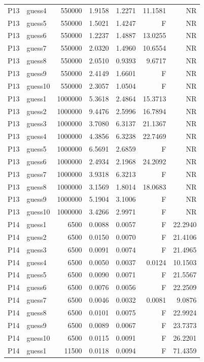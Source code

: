 {\begin{longtable}{llrrrrr}
P13 & guess4 & 550000 & 1.9158 & 1.2271 & 11.1581 & NR \\
P13 & guess5 & 550000 & 1.5021 & 1.4247 & F & NR \\
P13 & guess6 & 550000 & 1.2237 & 1.4887 & 13.0255 & NR \\
P13 & guess7 & 550000 & 2.0320 & 1.4960 & 10.6554 & NR \\
P13 & guess8 & 550000 & 2.0510 & 0.9393 & 9.6717 & NR \\
P13 & guess9 & 550000 & 2.4149 & 1.6601 & F & NR \\
P13 & guess10 & 550000 & 2.3057 & 1.0504 & F & NR \\
P13 & guess1 & 1000000 & 5.3618 & 2.4864 & 15.3713 & NR \\
P13 & guess2 & 1000000 & 9.4476 & 2.5996 & 16.7894 & NR \\
P13 & guess3 & 1000000 & 3.7080 & 6.3137 & 21.1367 & NR \\
P13 & guess4 & 1000000 & 4.3856 & 6.3238 & 22.7469 & NR \\
P13 & guess5 & 1000000 & 6.5691 & 2.6859 & F & NR \\
P13 & guess6 & 1000000 & 2.4934 & 2.1968 & 24.2092 & NR \\
P13 & guess7 & 1000000 & 3.9318 & 6.3213 & F & NR \\
P13 & guess8 & 1000000 & 3.1569 & 1.8014 & 18.0683 & NR \\
P13 & guess9 & 1000000 & 5.1904 & 3.1006 & F & NR \\
P13 & guess10 & 1000000 & 3.4266 & 2.9971 & F & NR \\
P14 & guess1 & 6500 & 0.0088 & 0.0057 & F & 22.2940 \\
P14 & guess2 & 6500 & 0.0150 & 0.0070 & F & 21.4106 \\
P14 & guess3 & 6500 & 0.0091 & 0.0074 & F & 21.4965 \\
P14 & guess4 & 6500 & 0.0050 & 0.0037 & 0.0124 & 10.1503 \\
P14 & guess5 & 6500 & 0.0090 & 0.0071 & F & 21.5567 \\
P14 & guess6 & 6500 & 0.0076 & 0.0056 & F & 22.2509 \\
P14 & guess7 & 6500 & 0.0046 & 0.0032 & 0.0081 & 9.0876 \\
P14 & guess8 & 6500 & 0.0101 & 0.0075 & F & 22.9924 \\
P14 & guess9 & 6500 & 0.0089 & 0.0067 & F & 23.7373 \\
P14 & guess10 & 6500 & 0.0115 & 0.0091 & F & 26.2201 \\
P14 & guess1 & 11500 & 0.0118 & 0.0094 & F & 71.4359 \\

\end{longtable}}

